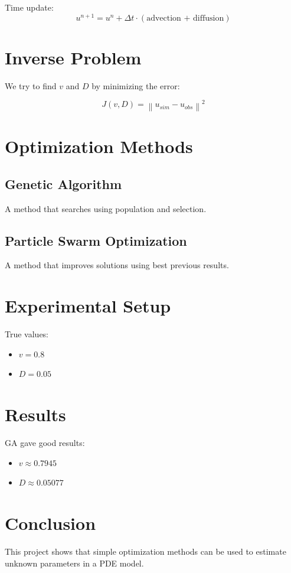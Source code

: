 \documentclass[11pt,a4paper]{article}
\begin{document}
Time update:
\begin{equation}
u^{n+1} = u^n + \Delta t \cdot (\text{advection + diffusion})
\end{equation}

\section{Inverse Problem}

We try to find $v$ and $D$ by minimizing the error:

\begin{equation}
J(v,D) =
\left\| u_{sim} - u_{obs} \right\|^2
\end{equation}

\section{Optimization Methods}

\subsection{Genetic Algorithm}
A method that searches using population and selection.

\subsection{Particle Swarm Optimization}
A method that improves solutions using best previous results.

\section{Experimental Setup}

True values:
\begin{itemize}
\item $v = 0.8$
\item $D = 0.05$
\end{itemize}

\section{Results}

GA gave good results:
\begin{itemize}
\item $v \approx 0.7945$
\item $D \approx 0.05077$
\end{itemize}

\section{Conclusion}

This project shows that simple optimization methods can be used to estimate unknown parameters in a PDE model.
\end{document}
